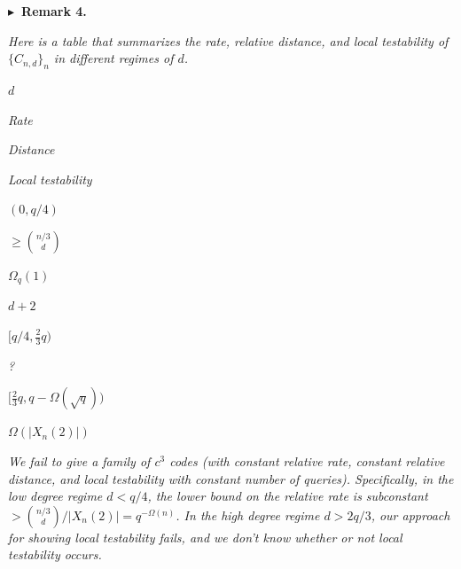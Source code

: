 \documentclass[10pt,a4paper]{article}
\begin{document}





\par\medskip\noindent\textbf{
$\blacktriangleright$ Remark 4.
}\par



\emph{Here is a table that summarizes the rate, relative distance, and local testability of $\{C_{n,d}\}_{n}$ in different regimes of $d$.}\par









$d$

 


\emph{Rate}

 


\emph{Distance}

 


\emph{Local testability}

 
\par






$(0,q/4)$

 


\emph{$\geq{\binom{n/3}{d}}$}

 


\emph{$\Omega_{q}(1)$}

 


$d+2$

 
\par




$[q/4,\frac{2}{3}q)$

 


\emph{?}

 
\par




$[\frac{2}{3}q,q-\Omega(\sqrt{q}))$

 


$\Omega(\lvert X_{n}(2)\rvert)$

 
\par







\emph{We fail to give a family of $c^{3}$ codes (with constant relative rate, constant relative distance, and local testability with constant number of queries). Specifically, in the low degree regime $d<q/4$, the lower bound on the relative rate is subconstant $>{\binom{n/3}{d}}/\lvert X_{n}(2)\rvert=q^{-\Omega(n)}$. In the high degree regime $d>2q/3$, our approach for showing local testability fails, and we don’t know whether or not local testability occurs.}\par
\end{document}
